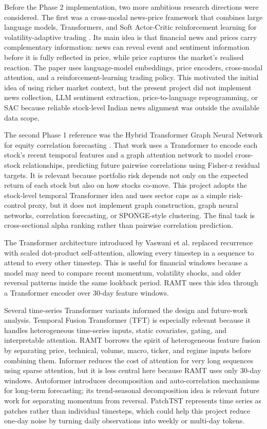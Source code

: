 \documentclass[conference]{IEEEtran}
\begin{document}
Before the Phase 2 implementation, two more ambitious research directions were considered. The first was a cross-modal news-price framework that combines large language models, Transformers, and Soft Actor-Critic reinforcement learning for volatility-adaptive trading \cite{alignnews2026}. Its main idea is that financial news and prices carry complementary information: news can reveal event and sentiment information before it is fully reflected in price, while price captures the market's realised reaction. The paper uses language-model embeddings, price encoders, cross-modal attention, and a reinforcement-learning trading policy. This motivated the initial idea of using richer market context, but the present project did not implement news collection, LLM sentiment extraction, price-to-language reprogramming, or SAC because reliable stock-level Indian news alignment was outside the available data scope.

The second Phase 1 reference was the Hybrid Transformer Graph Neural Network for equity correlation forecasting \cite{fanshawe2026}. That work uses a Transformer to encode each stock's recent temporal features and a graph attention network to model cross-stock relationships, predicting future pairwise correlations using Fisher-z residual targets. It is relevant because portfolio risk depends not only on the expected return of each stock but also on how stocks co-move. This project adopts the stock-level temporal Transformer idea and uses sector caps as a simple risk-control proxy, but it does not implement graph construction, graph neural networks, correlation forecasting, or SPONGE-style clustering. The final task is cross-sectional alpha ranking rather than pairwise correlation prediction.

The Transformer architecture introduced by Vaswani et al. \cite{vaswani2017} replaced recurrence with scaled dot-product self-attention, allowing every timestep in a sequence to attend to every other timestep. This is useful for financial windows because a model may need to compare recent momentum, volatility shocks, and older reversal patterns inside the same lookback period. RAMT uses this idea through a Transformer encoder over 30-day feature windows.

Several time-series Transformer variants informed the design and future-work analysis. Temporal Fusion Transformer (TFT) \cite{lim2021} is especially relevant because it handles heterogeneous time-series inputs, static covariates, gating, and interpretable attention. RAMT borrows the spirit of heterogeneous feature fusion by separating price, technical, volume, macro, ticker, and regime inputs before combining them. Informer \cite{zhou2021informer} reduces the cost of attention for very long sequences using sparse attention, but it is less central here because RAMT uses only 30-day windows. Autoformer \cite{wu2021autoformer} introduces decomposition and auto-correlation mechanisms for long-term forecasting; its trend-seasonal decomposition idea is relevant future work for separating momentum from reversal. PatchTST \cite{nie2023patchtst} represents time series as patches rather than individual timesteps, which could help this project reduce one-day noise by turning daily observations into weekly or multi-day tokens.
\end{document}

